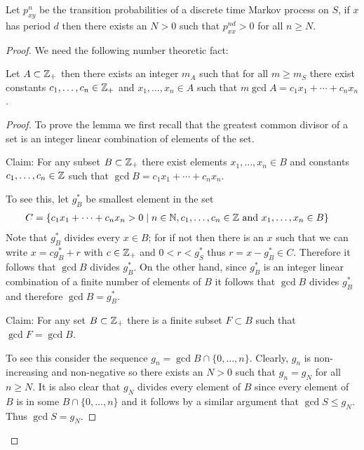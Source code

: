 \begin{prop}\label{PeriodicReturnDiscreteTimeMarkov}Let $p^n_{xy}$ be the transition probabilities of a
  discrete time Markov process on $S$, if $x$ has period $d$
  then there exists an $N > 0$ such that $p^{nd}_{xx} > 0$ for all $n
  \geq N$.
\end{prop}
\begin{proof}
We need the following number theoretic fact:

\begin{lem}Let $A \subset \mathbb{Z}_+$ then there exists an integer $m_A$
such that for all $m \geq m_S$ there exist constants $c_1, \dotsc ,
c_n \in \mathbb{Z}_+$ and $x_1, \dotsc, x_n \in A$ such that $m \gcd A = c_1 x_1 + \dotsb +
c_n x_n$.
\end{lem}
\begin{proof}
To prove the lemma we first recall that the greatest common divisor of
a set is an integer linear combination of elements of the set.  

Claim: For any subset $B \subset \mathbb{Z}_+$ there exist elements
$x_1, \dotsc, x_n \in B$ and constants $c_1, \dotsc, c_n \in \mathbb{Z}$
such that $\gcd B = c_1 x_1 + \dotsb + c_n x_n$.

To see this, let $g^*_B$ be
smallest element in the set 
\begin{align*}
C &= \lbrace c_1 x_1 + \dotsb +
c_n x_n > 0 \mid n \in \mathbb{N}, c_1, \dotsc, c_n \in \mathbb{Z} \text{ and } x_1,
\dotsc, x_n \in B \rbrace
\end{align*}
  Note that
$g^*_B$ divides every $x \in B$; for if not then there is an $x$ such that
we can write $x = c
g^*_B + r$ with $c \in \mathbb{Z}_+$ and $0 < r < g^*_S$ thus $r = x
- g_B^* \in C$.  Therefore it follows that $\gcd B$ divides $g^*_B$.
On the other hand, since $g^*_B$ is an integer linear combination of a
finite number of
elements of $B$ it follows that $\gcd B$ divides $g^*_B$ and
therefore $\gcd B = g^*_B$.

Claim: For any set $B \subset
\mathbb{Z}_+$ there is a finite subset $F \subset B$ such that $\gcd F
= \gcd B$.  

To see this consider the sequence $g_n = \gcd B \cap \lbrace 0,
\dots, n \rbrace$.  Clearly, $g_n$ is non-increasing and non-negative
so there exists an $N > 0$ such that $g_n = g_N$ for all $n \geq N$.
It is also clear that $g_N$ divides every element of $B$ since every
element of $B$ is in some $B \cap \lbrace 0,
\dots, n \rbrace$ and it follows by a similar argument that $\gcd S
\leq g_N$. Thus $\gcd S = g_N$.


\end{proof}
\end{proof}
